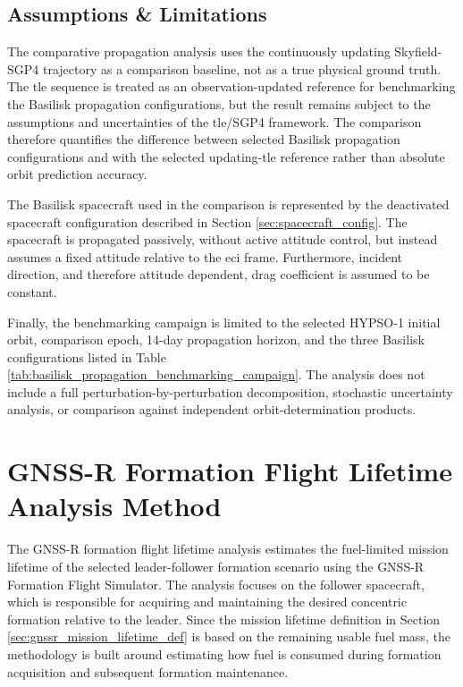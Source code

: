 \subsection{Assumptions \& Limitations}
The comparative propagation analysis uses the continuously updating Skyfield-SGP4 trajectory as a comparison baseline, not as a true physical ground truth. The \gls{tle} sequence is treated as an observation-updated reference for benchmarking the Basilisk propagation configurations, but the result remains subject to the assumptions and uncertainties of the \gls{tle}/SGP4 framework. The comparison therefore quantifies the difference between selected Basilisk propagation configurations and with the selected updating-\gls{tle} reference rather than absolute orbit prediction accuracy.

\clearpage
The Basilisk spacecraft used in the comparison is represented by the deactivated spacecraft configuration described in Section \ref{sec:spacecraft_config}. The spacecraft is propagated passively, without active attitude control, but instead assumes a fixed attitude relative to the \gls{eci} frame. Furthermore, incident direction, and therefore attitude dependent, drag coefficient is assumed to be constant.

Finally, the benchmarking campaign is limited to the selected HYPSO-1 initial orbit, comparison epoch, 14-day propagation horizon, and the three Basilisk configurations listed in Table \ref{tab:basilisk_propagation_benchmarking_campaign}. The analysis does not include a full perturbation-by-perturbation decomposition, stochastic uncertainty analysis, or comparison against independent orbit-determination products. 




\section{GNSS-R Formation Flight Lifetime Analysis Method}
The GNSS-R formation flight lifetime analysis estimates the fuel-limited mission lifetime of the selected leader-follower formation scenario using the GNSS-R Formation Flight Simulator. The analysis focuses on the follower spacecraft, which is responsible for acquiring and maintaining the desired concentric formation relative to the leader. Since the mission lifetime definition in Section \ref{sec:gnssr_mission_lifetime_def} is based on the remaining usable fuel mass, the methodology is built around estimating how fuel is consumed during formation acquisition and subsequent formation maintenance.

